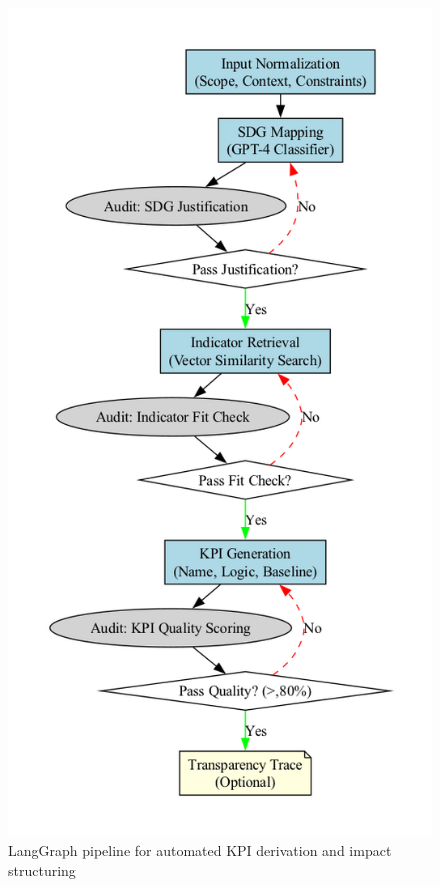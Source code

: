 \begin{figure}[H]
    \centering
    \includegraphics[height = 0.9\textheight]{../fig/langgraph_pipeline}
    \caption{LangGraph pipeline for automated KPI derivation and impact structuring}
    \label{fig:langgraph-pipeline}
\end{figure}

